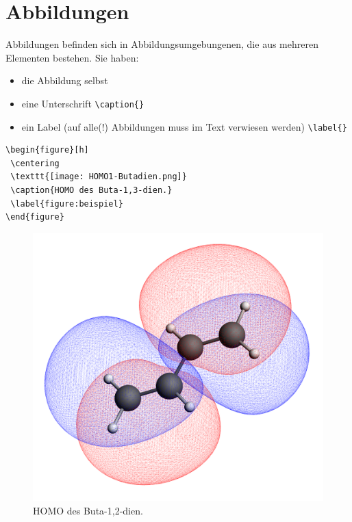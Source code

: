 \section{Abbildungen}
Abbildungen befinden sich in Abbildungsumgebungenen, die
aus mehreren Elementen bestehen. Sie haben:

\begin{itemize}
 \item die Abbildung selbst
 \item eine Unterschrift \lstinline$\caption{}$
 \item ein Label (auf alle(!) Abbildungen muss im Text verwiesen werden)
       \lstinline$\label{}$
\end{itemize}

\begin{lstlisting}
\begin{figure}[h]
 \centering
 \texttt{[image: HOMO1-Butadien.png]}
 \caption{HOMO des Buta-1,3-dien.}
 \label{figure:beispiel}
\end{figure}
\end{lstlisting}

\begin{figure}[h]
 \centering
 \includegraphics[scale=0.02]{HOMO1-Buten.png}
 \caption{HOMO des Buta-1,2-dien.}
 \label{figure:beispiel}
\end{figure}
